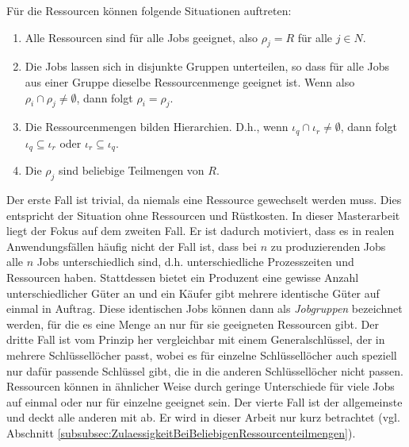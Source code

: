 \documentclass{scrreprt}
\begin{document}
Für die Ressourcen können folgende Situationen auftreten:
\begin{enumerate}
    \item Alle Ressourcen sind für alle Jobs geeignet, also $\rho_j=R$ für alle $j\in N$.
    \item Die Jobs lassen sich in disjunkte Gruppen unterteilen, so dass für alle Jobs aus einer Gruppe dieselbe Ressourcenmenge geeignet ist.
        Wenn also $\rho_i \cap \rho_j \neq \emptyset$, dann folgt $\rho_i=\rho_j$.
    \item Die Ressourcenmengen bilden Hierarchien. 
        D.h., wenn $\iota_q \cap \iota_r \neq \emptyset$, dann folgt $\iota_q \subseteq \iota_r$ oder $\iota_r \subseteq \iota_q$.
    \item Die $\rho_j$ sind beliebige Teilmengen von $R$.
\end{enumerate}%
Der erste Fall ist trivial, da niemals eine Ressource gewechselt werden muss.
Dies entspricht der Situation ohne Ressourcen und Rüstkosten.
In dieser Masterarbeit liegt der Fokus auf dem zweiten Fall.
Er ist dadurch motiviert, dass es in realen Anwendungsfällen häufig nicht der Fall ist, dass bei $n$ zu produzierenden Jobs alle $n$ Jobs unterschiedlich sind,
d.h. unterschiedliche Prozesszeiten und Ressourcen haben.
Stattdessen bietet ein Produzent eine gewisse Anzahl unterschiedlicher Güter an und ein Käufer gibt mehrere identische Güter auf einmal in Auftrag.
Diese identischen Jobs können dann als \textit{Jobgruppen} bezeichnet werden, für die es eine Menge an nur für sie geeigneten Ressourcen gibt.
Der dritte Fall ist vom Prinzip her vergleichbar mit einem Generalschlüssel, der in mehrere Schlüssellöcher passt,
wobei es für einzelne Schlüssellöcher auch speziell nur dafür passende Schlüssel gibt, die in die anderen Schlüssellöcher nicht passen.
Ressourcen können in ähnlicher Weise durch geringe Unterschiede für viele Jobs auf einmal oder nur für einzelne geeignet sein.
Der vierte Fall ist der allgemeinste und deckt alle anderen mit ab.
Er wird in dieser Arbeit nur kurz betrachtet (vgl. Abschnitt \ref{subsubsec:ZulaessigkeitBeiBeliebigenRessourcenteilmengen}).
\end{document}
